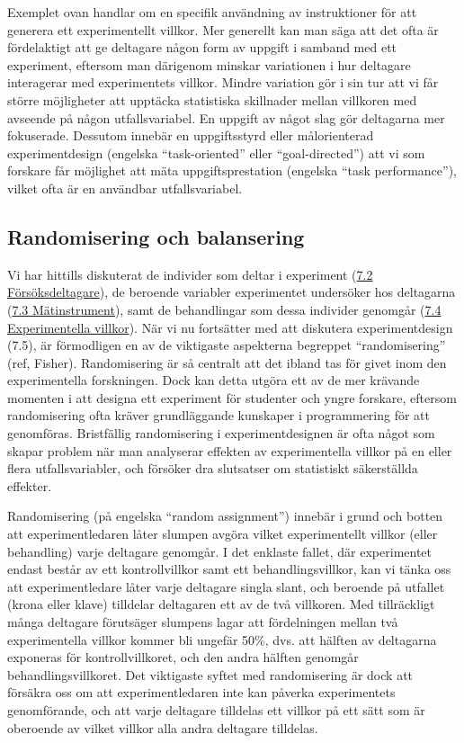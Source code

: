 \documentclass[
]{book}
\begin{document}
Exemplet ovan handlar om en specifik användning av instruktioner för att generera ett experimentellt villkor. Mer generellt kan man säga att det ofta är fördelaktigt att ge deltagare någon form av uppgift i samband med ett experiment, eftersom man därigenom minskar variationen i hur deltagare interagerar med experimentets villkor. Mindre variation gör i sin tur att vi får större möjligheter att upptäcka statistiska skillnader mellan villkoren med avseende på någon utfallsvariabel. En uppgift av något slag gör deltagarna mer fokuserade. Dessutom innebär en uppgiftsstyrd eller målorienterad experimentdesign (engelska ``task-oriented'' eller ``goal-directed'') att vi som forskare får möjlighet att mäta uppgiftsprestation (engelska ``task performance''), vilket ofta är en användbar utfallsvariabel.

\hypertarget{sub07.5.2}{%
\subsection{Randomisering och balansering}\label{sub07.5.2}}

Vi har hittills diskuterat de individer som deltar i experiment (\protect\hyperlink{sec07.2}{7.2 Försöksdeltagare}), de beroende variabler experimentet undersöker hos deltagarna (\protect\hyperlink{sec07.3}{7.3 Mätinstrument}), samt de behandlingar som dessa individer genomgår (\protect\hyperlink{sec07.4}{7.4 Experimentella villkor}). När vi nu fortsätter med att diskutera experimentdesign (7.5), är förmodligen en av de viktigaste aspekterna begreppet ``randomisering'' (ref, Fisher). Randomisering är så centralt att det ibland tas för givet inom den experimentella forskningen. Dock kan detta utgöra ett av de mer krävande momenten i att designa ett experiment för studenter och yngre forskare, eftersom randomisering ofta kräver grundläggande kunskaper i programmering för att genomföras. Bristfällig randomisering i experimentdesignen är ofta något som skapar problem när man analyserar effekten av experimentella villkor på en eller flera utfallsvariabler, och försöker dra slutsatser om statistiskt säkerställda effekter.

Randomisering (på engelska ``random assignment'') innebär i grund och botten att experimentledaren låter slumpen avgöra vilket experimentellt villkor (eller behandling) varje deltagare genomgår. I det enklaste fallet, där experimentet endast består av ett kontrollvillkor samt ett behandlingsvillkor, kan vi tänka oss att experimentledare låter varje deltagare singla slant, och beroende på utfallet (krona eller klave) tilldelar deltagaren ett av de två villkoren. Med tillräckligt många deltagare förutsäger slumpens lagar att fördelningen mellan två experimentella villkor kommer bli ungefär 50\%, dvs. att hälften av deltagarna exponeras för kontrollvillkoret, och den andra hälften genomgår behandlingsvillkoret. Det viktigaste syftet med randomisering är dock att försäkra oss om att experimentledaren inte kan påverka experimentets genomförande, och att varje deltagare tilldelas ett villkor på ett sätt som är oberoende av vilket villkor alla andra deltagare tilldelas.
\end{document}
